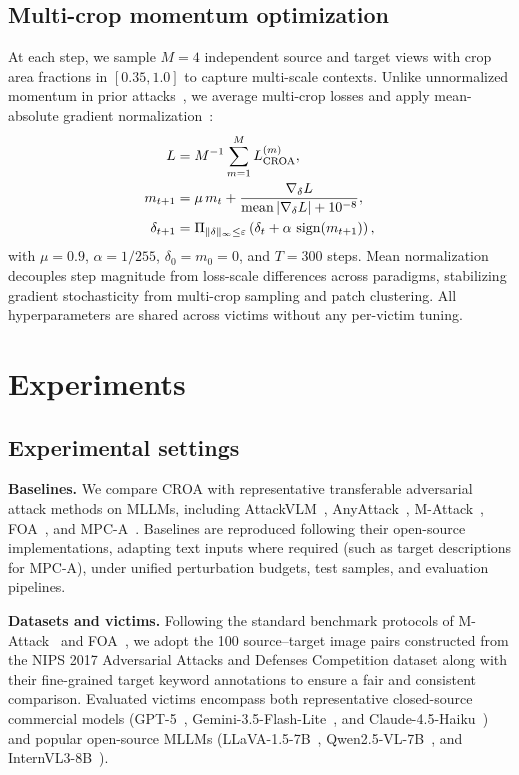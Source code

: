 \documentclass{article}
\newcommand{\ours}{\textsc{CROA}}
\begin{document}
\subsection{Multi-crop momentum optimization}
At each step, we sample $M=4$ independent source and target views with
crop area fractions in $[0.35,1.0]$ to capture multi-scale contexts.
Unlike unnormalized momentum in prior attacks~\cite{mpcattack}, we average
multi-crop losses and apply mean-absolute gradient normalization~\cite{mifgsm}:
\begin{align}
L&=M^{-1}\sum_{m=1}^{M}L_{\mathrm{CROA}}^{(m)},\label{eq:avg}\\
m_{t+1}&=\mu\,m_t+\frac{\nabla_\delta L}{\operatorname{mean}|\nabla_\delta L|+10^{-8}},\notag\\
\delta_{t+1}&=\Pi_{\|\delta\|_\infty\le\varepsilon}
\left(\delta_t+\alpha\,\operatorname{sign}(m_{t+1})\right),\notag
\end{align}
with $\mu=0.9$, $\alpha=1/255$, $\delta_0=m_0=0$, and $T=300$ steps.
Mean normalization decouples step magnitude from loss-scale differences
across paradigms, stabilizing gradient stochasticity from multi-crop
sampling and patch clustering. All hyperparameters are shared across
victims without any per-victim tuning.

\section{Experiments}
\subsection{Experimental settings}
\textbf{Baselines.} We compare \ours{} with representative transferable adversarial attack methods on MLLMs, including AttackVLM~\cite{attackvlm}, AnyAttack~\cite{anyattack}, M-Attack~\cite{mattack}, FOA~\cite{foa}, and MPC-A~\cite{mpcattack}. Baselines are reproduced following their open-source implementations, adapting text inputs where required (such as target descriptions for MPC-A), under unified perturbation budgets, test samples, and evaluation pipelines.

\textbf{Datasets and victims.} Following the standard benchmark protocols of M-Attack~\cite{mattack} and FOA~\cite{foa}, we adopt the 100 source--target image pairs constructed from the NIPS 2017 Adversarial Attacks and Defenses Competition dataset along with their fine-grained target keyword annotations to ensure a fair and consistent comparison. Evaluated victims encompass both representative closed-source commercial models (GPT-5~\cite{gpt5}, Gemini-3.5-Flash-Lite~\cite{gemini}, and Claude-4.5-Haiku~\cite{claude}) and popular open-source MLLMs (LLaVA-1.5-7B~\cite{llava}, Qwen2.5-VL-7B~\cite{qwenvl}, and InternVL3-8B~\cite{internvl}).
\end{document}
